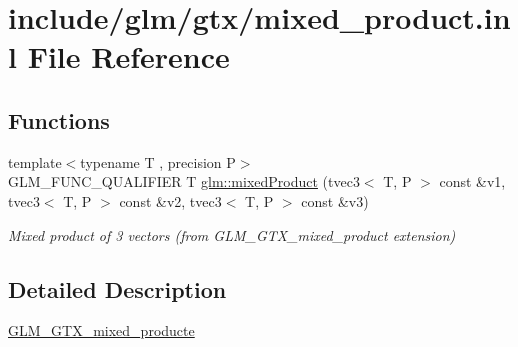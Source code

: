 \hypertarget{mixed__product_8inl}{}\section{include/glm/gtx/mixed\+\_\+product.inl File Reference}
\label{mixed__product_8inl}
\subsection*{Functions}
\begin{DoxyCompactItemize}
\item 
{\footnotesize template$<$typename T , precision P$>$ }\\G\+L\+M\+\_\+\+F\+U\+N\+C\+\_\+\+Q\+U\+A\+L\+I\+F\+I\+ER T \hyperlink{group__gtx__mixed__product_gaaee4cf80d69cb86de80f12af88b3c3af}{glm\+::mixed\+Product} (tvec3$<$ T, P $>$ const \&v1, tvec3$<$ T, P $>$ const \&v2, tvec3$<$ T, P $>$ const \&v3)
\begin{DoxyCompactList}\small\item\em Mixed product of 3 vectors (from G\+L\+M\+\_\+\+G\+T\+X\+\_\+mixed\+\_\+product extension) \end{DoxyCompactList}\end{DoxyCompactItemize}


\subsection{Detailed Description}
\hyperlink{group__gtx__mixed__product}{G\+L\+M\+\_\+\+G\+T\+X\+\_\+mixed\+\_\+producte} 